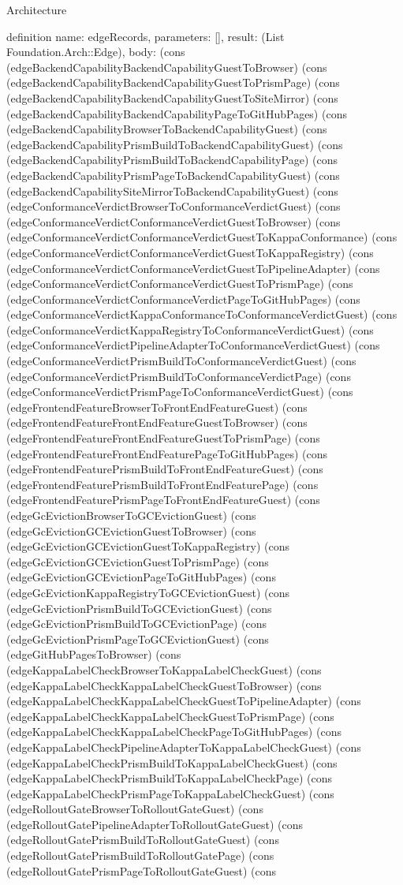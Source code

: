 \begin{lexlean}{Architecture}
\begin{semanticmodule}
definition{
  name: edgeRecords,
  parameters: [],
  result: (List Foundation.Arch::Edge),
  body: (cons (edgeBackendCapabilityBackendCapabilityGuestToBrowser) (cons (edgeBackendCapabilityBackendCapabilityGuestToPrismPage) (cons (edgeBackendCapabilityBackendCapabilityGuestToSiteMirror) (cons (edgeBackendCapabilityBackendCapabilityPageToGitHubPages) (cons (edgeBackendCapabilityBrowserToBackendCapabilityGuest) (cons (edgeBackendCapabilityPrismBuildToBackendCapabilityGuest) (cons (edgeBackendCapabilityPrismBuildToBackendCapabilityPage) (cons (edgeBackendCapabilityPrismPageToBackendCapabilityGuest) (cons (edgeBackendCapabilitySiteMirrorToBackendCapabilityGuest) (cons (edgeConformanceVerdictBrowserToConformanceVerdictGuest) (cons (edgeConformanceVerdictConformanceVerdictGuestToBrowser) (cons (edgeConformanceVerdictConformanceVerdictGuestToKappaConformance) (cons (edgeConformanceVerdictConformanceVerdictGuestToKappaRegistry) (cons (edgeConformanceVerdictConformanceVerdictGuestToPipelineAdapter) (cons (edgeConformanceVerdictConformanceVerdictGuestToPrismPage) (cons (edgeConformanceVerdictConformanceVerdictPageToGitHubPages) (cons (edgeConformanceVerdictKappaConformanceToConformanceVerdictGuest) (cons (edgeConformanceVerdictKappaRegistryToConformanceVerdictGuest) (cons (edgeConformanceVerdictPipelineAdapterToConformanceVerdictGuest) (cons (edgeConformanceVerdictPrismBuildToConformanceVerdictGuest) (cons (edgeConformanceVerdictPrismBuildToConformanceVerdictPage) (cons (edgeConformanceVerdictPrismPageToConformanceVerdictGuest) (cons (edgeFrontendFeatureBrowserToFrontEndFeatureGuest) (cons (edgeFrontendFeatureFrontEndFeatureGuestToBrowser) (cons (edgeFrontendFeatureFrontEndFeatureGuestToPrismPage) (cons (edgeFrontendFeatureFrontEndFeaturePageToGitHubPages) (cons (edgeFrontendFeaturePrismBuildToFrontEndFeatureGuest) (cons (edgeFrontendFeaturePrismBuildToFrontEndFeaturePage) (cons (edgeFrontendFeaturePrismPageToFrontEndFeatureGuest) (cons (edgeGcEvictionBrowserToGCEvictionGuest) (cons (edgeGcEvictionGCEvictionGuestToBrowser) (cons (edgeGcEvictionGCEvictionGuestToKappaRegistry) (cons (edgeGcEvictionGCEvictionGuestToPrismPage) (cons (edgeGcEvictionGCEvictionPageToGitHubPages) (cons (edgeGcEvictionKappaRegistryToGCEvictionGuest) (cons (edgeGcEvictionPrismBuildToGCEvictionGuest) (cons (edgeGcEvictionPrismBuildToGCEvictionPage) (cons (edgeGcEvictionPrismPageToGCEvictionGuest) (cons (edgeGitHubPagesToBrowser) (cons (edgeKappaLabelCheckBrowserToKappaLabelCheckGuest) (cons (edgeKappaLabelCheckKappaLabelCheckGuestToBrowser) (cons (edgeKappaLabelCheckKappaLabelCheckGuestToPipelineAdapter) (cons (edgeKappaLabelCheckKappaLabelCheckGuestToPrismPage) (cons (edgeKappaLabelCheckKappaLabelCheckPageToGitHubPages) (cons (edgeKappaLabelCheckPipelineAdapterToKappaLabelCheckGuest) (cons (edgeKappaLabelCheckPrismBuildToKappaLabelCheckGuest) (cons (edgeKappaLabelCheckPrismBuildToKappaLabelCheckPage) (cons (edgeKappaLabelCheckPrismPageToKappaLabelCheckGuest) (cons (edgeRolloutGateBrowserToRolloutGateGuest) (cons (edgeRolloutGatePipelineAdapterToRolloutGateGuest) (cons (edgeRolloutGatePrismBuildToRolloutGateGuest) (cons (edgeRolloutGatePrismBuildToRolloutGatePage) (cons (edgeRolloutGatePrismPageToRolloutGateGuest) (cons }
\end{semanticmodule}
\end{lexlean}
